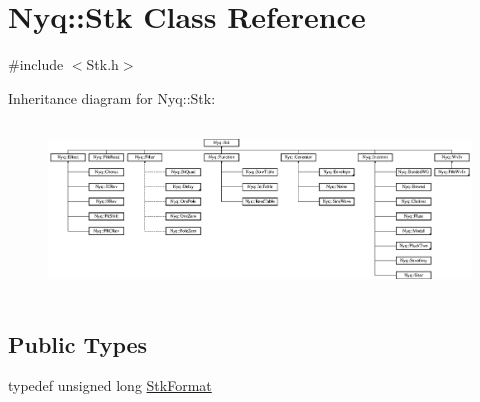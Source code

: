 \hypertarget{class_nyq_1_1_stk}{}\section{Nyq\+:\+:Stk Class Reference}
\label{class_nyq_1_1_stk}


{\ttfamily \#include $<$Stk.\+h$>$}

Inheritance diagram for Nyq\+:\+:Stk\+:\begin{figure}[H]
\begin{center}
\leavevmode
\includegraphics[height=4.586405cm]{class_nyq_1_1_stk}
\end{center}
\end{figure}
\subsection*{Public Types}
\begin{DoxyCompactItemize}
\item 
typedef unsigned long \hyperlink{class_nyq_1_1_stk_aa6d484c1fa51ab651997a158cdc42526}{Stk\+Format}
\end{DoxyCompactItemize}
